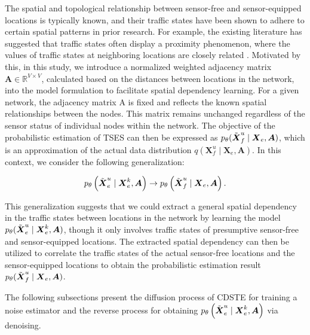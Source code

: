\documentclass[a4paper,fleqn,12pt]{cas-sc}
\newcommand{\rev}[1]{{\color{red} #1}}
\begin{document}
The spatial and topological relationship between sensor-free and sensor-equipped locations is typically known, and their traffic states have been shown to adhere to certain spatial patterns in prior research. For example, the existing literature has suggested that traffic states often display a proximity phenomenon, where the values of traffic states at neighboring locations are closely related \citep{cheng2020examining, sun2020identifying}. Motivated by this, in this study, we introduce a normalized weighted adjacency matrix $\boldsymbol{A}\in\mathbb{R}^{V\times V}$, calculated based on the distances between locations in the network, into the model formulation to facilitate spatial dependency learning. \rev{For a given network, the adjacency matrix A is fixed and reflects the known spatial relationships between the nodes. This matrix remains unchanged regardless of the sensor status of individual nodes within the network.} The objective of the probabilistic estimation of TSES can then be expressed as $p_{\theta}(\Tilde{\boldsymbol{X}}^{u}_{f} \mid \boldsymbol{X}_{e}, \boldsymbol{A})$, which is an approximation of the actual data distribution $q(\boldsymbol{X}_{f}^{u} \mid \boldsymbol{X}_{e}, \boldsymbol{A})$. In this context, we consider the following generalization:
\begin{linenomath*}
\begin{equation}
p_{\theta}\left(\Tilde{\boldsymbol{X}}^{u}_{e} \mid \boldsymbol{X}^{k}_{e}, \boldsymbol{A}\right)\rightarrow p_{\theta}\left(\Tilde{\boldsymbol{X}}^{u}_{f} \mid \boldsymbol{X}_{e}, \boldsymbol{A}\right).
\label{equ:ModelGeneralization}
\end{equation}
\end{linenomath*} 
This generalization suggests that we could extract a general spatial dependency in the traffic states between locations in the network by learning the model $p_{\theta}(\Tilde{\boldsymbol{X}}^{u}_{e} \mid \boldsymbol{X}^{k}_{e}, \boldsymbol{A})$, though it only involves traffic states of presumptive sensor-free and sensor-equipped locations. The extracted spatial dependency can then be utilized to correlate the traffic states of the actual sensor-free locations and the sensor-equipped locations to obtain the probabilistic estimation result $p_{\theta}(\Tilde{\boldsymbol{X}}^{u}_{f} \mid \boldsymbol{X}_{e}, \boldsymbol{A})$.

The following subsections present the diffusion process of CDSTE for training a noise estimator and the reverse process for obtaining $p_{\theta}\left(\Tilde{\boldsymbol{X}}^{u}_{e} \mid \boldsymbol{X}^{k}_{e}, \boldsymbol{A}\right)$ via denoising. 
\end{document}
